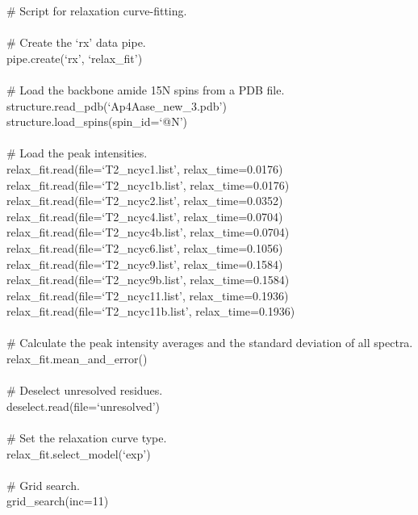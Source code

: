\begin{exampleenv}
\# Script for relaxation curve-fitting. \\
 \\
\# Create the `rx' data pipe. \\
pipe.create(`rx', `relax\_fit') \\
 \\
\# Load the backbone amide 15N spins from a PDB file. \\
structure.read\_pdb(`Ap4Aase\_new\_3.pdb') \\
structure.load\_spins(spin\_id=`@N') \\
 \\
\# Load the peak intensities. \\
relax\_fit.read(file=`T2\_ncyc1.list', relax\_time=0.0176) \\
relax\_fit.read(file=`T2\_ncyc1b.list', relax\_time=0.0176) \\
relax\_fit.read(file=`T2\_ncyc2.list', relax\_time=0.0352) \\
relax\_fit.read(file=`T2\_ncyc4.list', relax\_time=0.0704) \\
relax\_fit.read(file=`T2\_ncyc4b.list', relax\_time=0.0704) \\
relax\_fit.read(file=`T2\_ncyc6.list', relax\_time=0.1056) \\
relax\_fit.read(file=`T2\_ncyc9.list', relax\_time=0.1584) \\
relax\_fit.read(file=`T2\_ncyc9b.list', relax\_time=0.1584) \\
relax\_fit.read(file=`T2\_ncyc11.list', relax\_time=0.1936) \\
relax\_fit.read(file=`T2\_ncyc11b.list', relax\_time=0.1936) \\
 \\
\# Calculate the peak intensity averages and the standard deviation of all spectra. \\
relax\_fit.mean\_and\_error() \\
 \\
\# Deselect unresolved residues. \\
deselect.read(file=`unresolved') \\
 \\
\# Set the relaxation curve type. \\
relax\_fit.select\_model(`exp') \\
 \\
\# Grid search. \\
grid\_search(inc=11) \\
 \\

\end{exampleenv}

